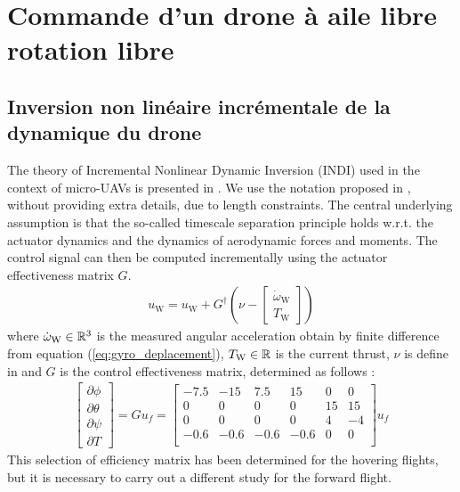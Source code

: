 \chapter{Commande d'un drone à aile libre rotation libre}
\minitoc

\section{Inversion non linéaire incrémentale de la dynamique du drone}
The theory of Incremental Nonlinear Dynamic Inversion (INDI) used in the context of micro-UAVs is presented in \cite{smeurINDI}. We use the notation proposed in \cite{smeurINDITail}, without providing extra details, due to length constraints. The central underlying assumption is that the so-called timescale separation principle holds w.r.t. the actuator dynamics and the dynamics of aerodynamic forces and moments. The control signal can then be computed incrementally using the actuator effectiveness matrix $G$.
\begin{align}
    u_{\text{W}} = u_{\text{W}} + G^{\dag} (\nu - \begin{bmatrix}
    \dot{\omega}_{\text{W}} \\
    T_{\text{W}}
    \end{bmatrix})
\end{align}
where $ \dot{\omega}_{\text{W}} \in {\mathbb R}^{3}$ is the measured angular acceleration obtain by finite difference from equation (\ref{eq:gyro_deplacement}), $T_{\text{W}} \in {\mathbb R}$ is the current thrust, $\nu$ is define in \cite[equation (4)]{smeurINDITail} and $G$ is the control effectiveness matrix, determined as follows :
\begin{align*}
    \begin{bmatrix}
    \partial \phi \\
    \partial \theta \\
    \partial \psi \\
    \partial T
    \end{bmatrix}\! =\! G u_{f} \!=\!
    \begin{bmatrix}
    -7.5 & -15 & 7.5 & 15 & 0 & 0\\
    0 & 0 & 0 & 0 & 15 & 15 \\
    0 & 0 & 0 & 0 & 4 & -4 \\
    -0.6 & -0.6 & -0.6 & -0.6 & 0 & 0\\
    \end{bmatrix}
    u_{f}
\end{align*}
This selection of efficiency matrix has been determined for the hovering flights, but it is necessary to carry out a different study for the forward flight.


